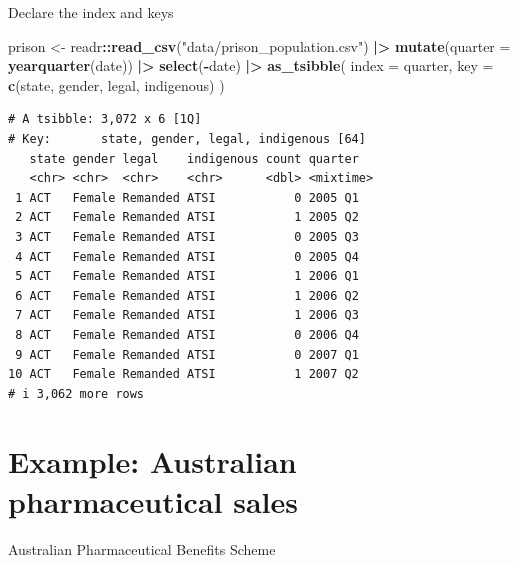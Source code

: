 \documentclass[
  14pt,
  ignorenonframetext,
  aspectratio=169,
]{beamer}
\newenvironment{Shaded}{\begin{snugshade}}{\end{snugshade}}
\newcommand{\AttributeTok}[1]{\textcolor[rgb]{0.13,0.29,0.53}{#1}}
\newcommand{\FunctionTok}[1]{\textcolor[rgb]{0.13,0.29,0.53}{\textbf{#1}}}
\newcommand{\NormalTok}[1]{#1}
\newcommand{\OtherTok}[1]{\textcolor[rgb]{0.56,0.35,0.01}{#1}}
\newcommand{\SpecialCharTok}[1]{\textcolor[rgb]{0.81,0.36,0.00}{\textbf{#1}}}
\newcommand{\StringTok}[1]{\textcolor[rgb]{0.31,0.60,0.02}{#1}}
\renewenvironment{Shaded}{\vspace*{0.15cm}\color{black}\fontsize{10}{10}\sf\begin{snugshade}\color{black}}{\end{snugshade}}
\begin{document}
\begin{frame}[fragile]{Declare the index and keys}
\protect{}\label{declare-the-index-and-keys}
\fontsize{10}{11}\sf

\begin{Shaded}
\begin{Highlighting}[]
\NormalTok{prison }\OtherTok{\textless{}{-}}\NormalTok{ readr}\SpecialCharTok{::}\FunctionTok{read\_csv}\NormalTok{(}\StringTok{"data/prison\_population.csv"}\NormalTok{) }\SpecialCharTok{|\textgreater{}}
  \FunctionTok{mutate}\NormalTok{(}\AttributeTok{quarter =} \FunctionTok{yearquarter}\NormalTok{(date)) }\SpecialCharTok{|\textgreater{}}
  \FunctionTok{select}\NormalTok{(}\SpecialCharTok{{-}}\NormalTok{date) }\SpecialCharTok{|\textgreater{}}
  \FunctionTok{as\_tsibble}\NormalTok{(}
    \AttributeTok{index =}\NormalTok{ quarter,}
    \AttributeTok{key =} \FunctionTok{c}\NormalTok{(state, gender, legal, indigenous)}
\NormalTok{  )}
\end{Highlighting}
\end{Shaded}

\begin{verbatim}
# A tsibble: 3,072 x 6 [1Q]
# Key:       state, gender, legal, indigenous [64]
   state gender legal    indigenous count quarter  
   <chr> <chr>  <chr>    <chr>      <dbl> <mixtime>
 1 ACT   Female Remanded ATSI           0 2005 Q1  
 2 ACT   Female Remanded ATSI           1 2005 Q2  
 3 ACT   Female Remanded ATSI           0 2005 Q3  
 4 ACT   Female Remanded ATSI           0 2005 Q4  
 5 ACT   Female Remanded ATSI           1 2006 Q1  
 6 ACT   Female Remanded ATSI           1 2006 Q2  
 7 ACT   Female Remanded ATSI           1 2006 Q3  
 8 ACT   Female Remanded ATSI           0 2006 Q4  
 9 ACT   Female Remanded ATSI           0 2007 Q1  
10 ACT   Female Remanded ATSI           1 2007 Q2  
# i 3,062 more rows
\end{verbatim}
\end{frame}

\section{Example: Australian pharmaceutical
sales}\label{example-australian-pharmaceutical-sales}

\begin{frame}{Australian Pharmaceutical Benefits Scheme}
\protect{}\label{australian-pharmaceutical-benefits-scheme}
\end{frame}
\end{document}

